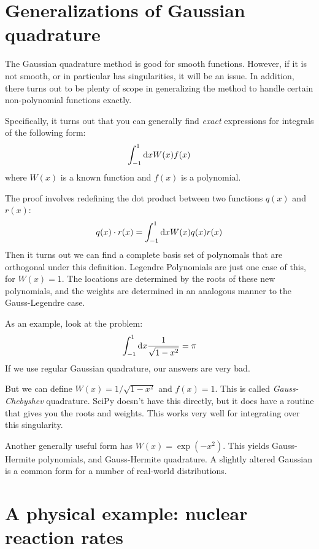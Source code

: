 \section{Generalizations of Gaussian quadrature}

The Gaussian quadrature method is good for smooth functions. However,
if it is not smooth, or in particular has singularities, it will be an
issue. In addition, there turns out to be plenty of scope in
generalizing the method to handle certain non-polynomial functions
exactly.

Specifically, it turns out that you can generally find {\it exact}
expressions for integrals of the following form:
\begin{equation}
\int_{-1}^{1} {\rm d}x W(x) f(x) 
\end{equation}
where $W(x)$ is a known function and $f(x)$ is a polynomial. 

The proof involves redefining the dot product between two functions
$q(x)$ and $r(x)$:
\begin{equation}
  q(x) \cdot r(x) = \int_{-1}^{1} {\rm d}x W(x) q(x) r(x)
\end{equation}
Then it turns out we can find a complete basis set of polynomals that
are orthogonal under this definition. Legendre Polynomials are just
one case of this, for $W(x)=1$. The locations are determined by the
roots of these new polynomials, and the weights are determined in an
analogous manner to the Gauss-Legendre case.

As an example, look at the problem:
\begin{equation}
\int_{-1}^{1} {\rm d}x \frac{1}{\sqrt{1-x^2}} = \pi
\end{equation}
If we use regular Gaussian quadrature, our answers are very bad.

But we can define $W(x)=1/\sqrt{1-x^2}$ and $f(x)=1$. This is called
{\it Gauss-Chebyshev} quadrature. SciPy doesn't have this directly,
but it does have a routine that gives you the roots and weights.  This
works very well for integrating over this singularity.

Another generally useful form has $W(x) = \exp(-x^2)$. This yields
Gauss-Hermite polynomials, and Gauss-Hermite quadrature. A slightly
altered Gaussian is a common form for a number of real-world
distributions. 

\section{A physical example: nuclear reaction rates}

